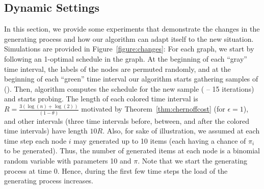% 
% 
% 




\subsection{Dynamic Settings}\label{sec:dynset}
In this section, we provide some experiments that demonstrate the changes in the generating process and how our algorithm can adapt itself to the new situation. Simulations are provided in Figure~\ref{figure:changes}: For each graph, we start by following an 1-optimal schedule in the graph. At the beginning of each ``gray'' time interval, the labels of the nodes are permuted randomly, and at the beginning of each ``green'' time interval our algorithm starts gathering samples of {\ins} ({\sampler}). Then, algorithm computes the schedule for the new sample ({\appoptimizer} -- 15 iterations) and starts probing. The length of each colored time interval is $R = \frac{3(\log(n)+\log(2))}{(1-\theta)}$ motivated by Theorem~\ref{thm:chernoffcost} (for $\epsilon=1$),  and other intervals (three time intervals before, between, and after the colored time intervals) have length $10R$. Also, for sake of illustration, we assumed at each time step each node $i$ may generated up to 10 items (each having a chance of $\pi_i$ to be generated). Thus, the number of generated items at each node is a binomial random variable with parameters 10 and $\pi$.
Note that we start the generating process at time 0. Hence, during the first few time steps the load of the generating process increases.

